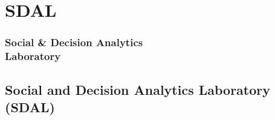 \documentclass[compress]{beamer}
\begin{document}

\section[SDAL]{SDAL}

	\begin{frame}[Section] \frametitle{\vspace{-0.2in}Social \& Decision Analytics\\Laboratory}
	\end{frame}

\subsection[Social and Decision Analytics Laboratory (SDAL)]{Social and Decision Analytics Laboratory (SDAL)}
\end{document}

